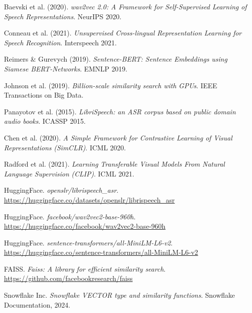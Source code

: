 \documentclass[12pt, a4paper]{article}
\begin{document}
\begin{enumerate}[leftmargin=1.5cm, label={[\arabic*]}]
  \item Baevski et al. (2020). \textit{wav2vec 2.0: A Framework for Self-Supervised
        Learning of Speech Representations}. NeurIPS 2020.

  \item Conneau et al. (2021). \textit{Unsupervised Cross-lingual Representation
        Learning for Speech Recognition}. Interspeech 2021.

  \item Reimers \& Gurevych (2019). \textit{Sentence-BERT: Sentence Embeddings
        using Siamese BERT-Networks}. EMNLP 2019.

  \item Johnson et al. (2019). \textit{Billion-scale similarity search with GPUs}.
        IEEE Transactions on Big Data.

  \item Panayotov et al. (2015). \textit{LibriSpeech: an ASR corpus based on
        public domain audio books}. ICASSP 2015.

  \item Chen et al. (2020). \textit{A Simple Framework for Contrastive Learning
        of Visual Representations (SimCLR)}. ICML 2020.

  \item Radford et al. (2021). \textit{Learning Transferable Visual Models
        From Natural Language Supervision (CLIP)}. ICML 2021.

  \item HuggingFace. \textit{openslr/librispeech\_asr}.
        \url{https://huggingface.co/datasets/openslr/librispeech_asr}

  \item HuggingFace. \textit{facebook/wav2vec2-base-960h}.
        \url{https://huggingface.co/facebook/wav2vec2-base-960h}

  \item HuggingFace. \textit{sentence-transformers/all-MiniLM-L6-v2}.
        \url{https://huggingface.co/sentence-transformers/all-MiniLM-L6-v2}

  \item FAISS. \textit{Faiss: A library for efficient similarity search}.
        \url{https://github.com/facebookresearch/faiss}

  \item Snowflake Inc. \textit{Snowflake VECTOR type and similarity functions}.
        Snowflake Documentation, 2024.
\end{enumerate}

\end{document}
